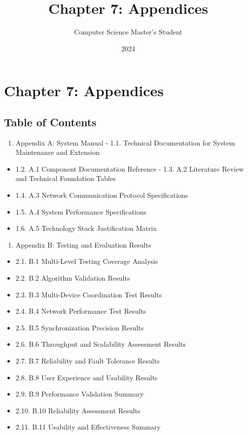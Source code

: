 \documentclass[12pt,a4paper]{article}
\title{Chapter 7: Appendices}
\author{Computer Science Master's Student}
\date{2024}
\begin{document}
\maketitle

\section{Chapter 7: Appendices}

\subsection{Table of Contents}

\begin{enumerate}
\item Appendix A: System Manual
    -
    1.1. Technical Documentation for System Maintenance and Extension
\end{enumerate}
\begin{itemize}
\item 1.2. A.1 Component Documentation Reference
    -
    1.3. A.2 Literature Review and Technical Foundation Tables
\item 1.4. A.3 Network Communication Protocol Specifications
\item 1.5. A.4 System Performance Specifications
\item 1.6. A.5 Technology Stack Justification Matrix
\end{itemize}
\begin{enumerate}
\item Appendix B: Testing and Evaluation Results
\end{enumerate}
\begin{itemize}
\item 2.1. B.1 Multi-Level Testing Coverage Analysis
\item 2.2. B.2 Algorithm Validation Results
\item 2.3. B.3 Multi-Device Coordination Test Results
\item 2.4. B.4 Network Performance Test Results
\item 2.5. B.5 Synchronization Precision Results
\item 2.6. B.6 Throughput and Scalability Assessment Results
\item 2.7. B.7 Reliability and Fault Tolerance Results
\item 2.8. B.8 User Experience and Usability Results
\item 2.9. B.9 Performance Validation Summary
\item 2.10. B.10 Reliability Assessment Results
\item 2.11. B.11 Usability and Effectiveness Summary
\end{itemize}
\end{document}
